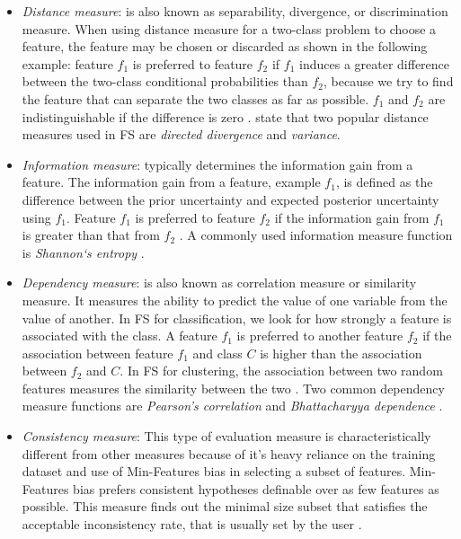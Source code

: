 \begin{itemize}
  \item \textit{Distance measure}: is also known as separability, divergence, or discrimination measure. When using distance measure for a two-class problem to choose a feature, the feature may be chosen or discarded as shown in the following example: feature $f_{1}$ is preferred to feature $f_{2}$ if $f_{1}$ induces a greater difference between the two-class conditional probabilities than $f_{2}$, because we try to find the feature that can separate the two classes as far as possible. $f_{1}$ and $f_{2}$ are indistinguishable if the difference is zero \citep{liu2005toward}. \citet{de2015feature} state that two popular distance measures used in FS are \textit{directed divergence} and \textit{variance}.
  \item \textit{Information measure}: typically determines the information gain from a feature. The information gain from a feature, example $f_{1}$, is defined as the difference between the prior uncertainty and expected posterior uncertainty using $f_{1}$. Feature $f_{1}$ is preferred to feature $f_{2}$ if the information gain from $f_{1}$ is greater than that from $f_{2}$ \citep{liu2005toward}. A commonly used information measure function is \textit{Shannon`s entropy} \citep{de2015feature}.
  \item \textit{Dependency measure}: is also known as correlation measure or similarity measure. It measures the ability to predict the value of one variable from the value of another. In FS for classification, we look for how strongly a feature is associated with the class. A feature $f_{1}$ is preferred to another feature $f_{2}$ if the association between feature $f_{1}$ and class $C$ is higher than the association between $f_{2}$ and $C$. In FS for clustering, the association between two random features measures the similarity between the two \citep{liu2005toward}. Two common dependency measure functions are \textit{Pearson's correlation} and \textit{Bhattacharyya dependence} \citep{de2015feature}.
  \item \textit{Consistency measure}: This type of evaluation measure is characteristically different from other measures because of it's heavy reliance on the training dataset and use of Min-Features bias in selecting a subset of features. Min-Features bias prefers consistent hypotheses definable over as few features as possible. This measure finds out the minimal size subset that satisfies the acceptable inconsistency rate, that is usually set by the user \citep{liu2005toward}.
\end{itemize}


